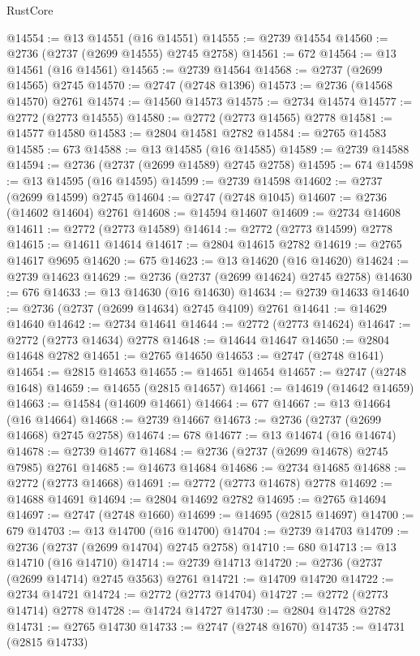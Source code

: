\begin{lexlean}{RustCore}
\begin{coremodule}
@14554 := @13 @14551 (@16 @14551)
@14555 := @2739 @14554
@14560 := @2736 (@2737 (@2699 @14555) @2745 @2758)
@14561 := 672
@14564 := @13 @14561 (@16 @14561)
@14565 := @2739 @14564
@14568 := @2737 (@2699 @14565) @2745
@14570 := @2747 (@2748 @1396)
@14573 := @2736 (@14568 @14570) @2761
@14574 := @14560 @14573
@14575 := @2734 @14574
@14577 := @2772 (@2773 @14555)
@14580 := @2772 (@2773 @14565) @2778
@14581 := @14577 @14580
@14583 := @2804 @14581 @2782
@14584 := @2765 @14583
@14585 := 673
@14588 := @13 @14585 (@16 @14585)
@14589 := @2739 @14588
@14594 := @2736 (@2737 (@2699 @14589) @2745 @2758)
@14595 := 674
@14598 := @13 @14595 (@16 @14595)
@14599 := @2739 @14598
@14602 := @2737 (@2699 @14599) @2745
@14604 := @2747 (@2748 @1045)
@14607 := @2736 (@14602 @14604) @2761
@14608 := @14594 @14607
@14609 := @2734 @14608
@14611 := @2772 (@2773 @14589)
@14614 := @2772 (@2773 @14599) @2778
@14615 := @14611 @14614
@14617 := @2804 @14615 @2782
@14619 := @2765 @14617 @9695
@14620 := 675
@14623 := @13 @14620 (@16 @14620)
@14624 := @2739 @14623
@14629 := @2736 (@2737 (@2699 @14624) @2745 @2758)
@14630 := 676
@14633 := @13 @14630 (@16 @14630)
@14634 := @2739 @14633
@14640 := @2736 (@2737 (@2699 @14634) @2745 @4109) @2761
@14641 := @14629 @14640
@14642 := @2734 @14641
@14644 := @2772 (@2773 @14624)
@14647 := @2772 (@2773 @14634) @2778
@14648 := @14644 @14647
@14650 := @2804 @14648 @2782
@14651 := @2765 @14650
@14653 := @2747 (@2748 @1641)
@14654 := @2815 @14653
@14655 := @14651 @14654
@14657 := @2747 (@2748 @1648)
@14659 := @14655 (@2815 @14657)
@14661 := @14619 (@14642 @14659)
@14663 := @14584 (@14609 @14661)
@14664 := 677
@14667 := @13 @14664 (@16 @14664)
@14668 := @2739 @14667
@14673 := @2736 (@2737 (@2699 @14668) @2745 @2758)
@14674 := 678
@14677 := @13 @14674 (@16 @14674)
@14678 := @2739 @14677
@14684 := @2736 (@2737 (@2699 @14678) @2745 @7985) @2761
@14685 := @14673 @14684
@14686 := @2734 @14685
@14688 := @2772 (@2773 @14668)
@14691 := @2772 (@2773 @14678) @2778
@14692 := @14688 @14691
@14694 := @2804 @14692 @2782
@14695 := @2765 @14694
@14697 := @2747 (@2748 @1660)
@14699 := @14695 (@2815 @14697)
@14700 := 679
@14703 := @13 @14700 (@16 @14700)
@14704 := @2739 @14703
@14709 := @2736 (@2737 (@2699 @14704) @2745 @2758)
@14710 := 680
@14713 := @13 @14710 (@16 @14710)
@14714 := @2739 @14713
@14720 := @2736 (@2737 (@2699 @14714) @2745 @3563) @2761
@14721 := @14709 @14720
@14722 := @2734 @14721
@14724 := @2772 (@2773 @14704)
@14727 := @2772 (@2773 @14714) @2778
@14728 := @14724 @14727
@14730 := @2804 @14728 @2782
@14731 := @2765 @14730
@14733 := @2747 (@2748 @1670)
@14735 := @14731 (@2815 @14733)

\end{coremodule}
\end{lexlean}
